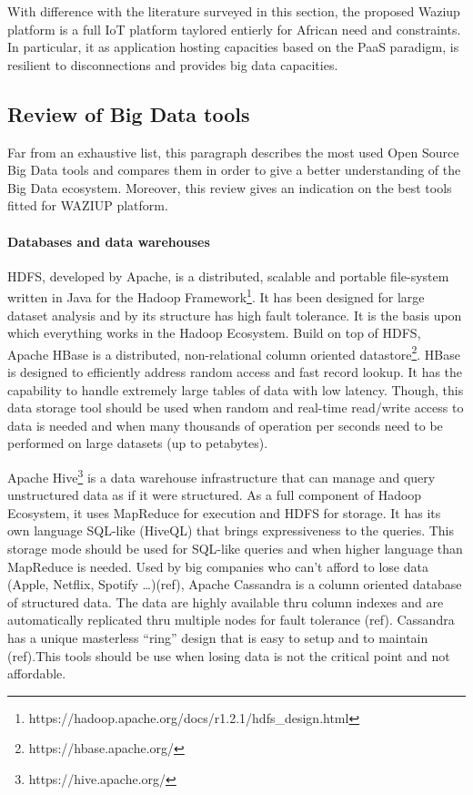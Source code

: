 With difference with the literature surveyed in this section, the proposed Waziup platform is a full IoT platform taylored entierly for African need and constraints.
In particular, it as application hosting capacities based on the PaaS paradigm, is resilient to disconnections and provides big data capacities.



\subsection{Review of Big Data tools}

Far from an exhaustive list, this paragraph describes the most used Open Source Big Data tools and compares them in order to give a better understanding of the Big Data ecosystem. Moreover, this review gives an indication on the best tools fitted for WAZIUP platform. 


\paragraph{Databases and data warehouses}

HDFS, developed by Apache, is a distributed, scalable and portable file-system written in Java for the Hadoop Framework\footnote{https://hadoop.apache.org/docs/r1.2.1/hdfs\_design.html}.
It has been designed for large dataset analysis and by its structure has high fault tolerance. It is the basis upon which everything works in the Hadoop Ecosystem.
Build on top of HDFS, Apache HBase is a distributed, non-relational column oriented datastore\footnote{https://hbase.apache.org/}.
HBase is designed to efficiently address random access and fast record lookup.
It has the capability to handle extremely large tables of data with low latency.
Though, this data storage tool should be used when random and real-time read/write access to data is needed and when many thousands of operation per seconds need to be performed on large datasets (up to petabytes).

Apache Hive\footnote{https://hive.apache.org/} is a data warehouse infrastructure that can manage and query unstructured data as if it were structured.
As a full component of Hadoop Ecosystem, it uses MapReduce for execution and HDFS for storage.
It has its own language SQL-like (HiveQL) that brings expressiveness to the queries.
This storage mode should be used for SQL-like queries and when higher language than MapReduce is needed.
Used by big companies who can’t afford to lose data (Apple, Netflix, Spotify …)(ref), Apache Cassandra is a column oriented database of structured data. The data are highly available thru column indexes and are automatically replicated thru multiple nodes for fault tolerance (ref).
Cassandra has a unique masterless “ring” design that is easy to setup and to maintain (ref).This tools should be use when losing data is not the critical point and not affordable.  

